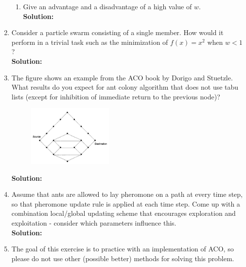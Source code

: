 \documentclass[a4paper]{article}
\begin{document}
\begin{enumerate}
\begin{enumerate}
	\item Give an advantage and a disadvantage of a high value of $w$.\\
	\textbf{Solution:}\\
	
\end{enumerate}

	\item Consider a particle swarm consisting of a single member. How would it perform in a trivial task such as the minimization of $f(x) = x^2$ when $w < 1$?\\
	\textbf{Solution:}\\
	
	
	\item The figure shows an example from the ACO book by Dorigo and Stuetzle. What results do you expect for ant colony algorithm that does not use tabu lists (except for inhibition of immediate return to the previous node)?
	
		\begin{figure}[H]
	    \centering
  	    \includegraphics[width=0.4\textwidth]{images/task3.PNG}
	    \end{figure}	
	
	
	\textbf{Solution:}\\
	
	
	\item Assume that ants are allowed to lay pheromone on a path at every time step, so that pheromone update rule is applied at each time step. Come up with a combination local/global updating scheme that encourages exploration and exploitation - consider which parameters influence this.\\
	\textbf{Solution:}\\
	



	\item The goal of this exercise is to practice with an implementation of ACO, so please do not use other (possible better) methods for solving this problem.
	

\end{enumerate}
\end{document}
